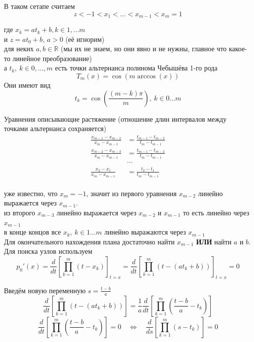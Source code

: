 \documentclass[12pt,a4paper]{article}
\begin{document}
	\noindent В таком сетапе считаем
	\[
	z < -1 < x_1 < \ldots < x_{m-1} < x_m = 1
	\]
	
	\noindent где $x_k = a t_{k} + b, k \in 1, \ldots m$ \\
	и $z=a t_0 + b$, $a > 0$ (её игнорим)\\
	для неких $a, b \in \mathbb{R}$ (мы их не знаем, но они явно и не нужны, главное что какое-то линейное преобразование) \\
	а $t_k, \  k \in 0, \ldots, m$ есть точки альтернанса полинома Чебышёва 1-го рода 
	\[
	T_{m}(x) = \cos( m \arccos(x))
	\]
	\noindent Они имеют вид 
	\[
	t_k = \cos \left( \frac{ (m-k) \pi}{m} \right), \ k \in 0 \ldots m
	\]
	
	\noindent Уравнения описывающие растяжение (отношение длин интервалов между точками альтернанса сохраняется)
	\begin{align*}
		\frac{x_{m-1} - x_{m-2}}{x_m - x_{m-1}} &= \frac{t_{m-1} - t_{m-2}}{t_m - t_{m-1}}\\[0.1in]
		\frac{x_{m-2} - x_{m-3}}{x_m - x_{m-1}} &= \frac{t_{m-1} - t_{m-2}}{t_m - t_{m-1}}\\[0.1in]
		&\cdots\\[0.1in]
		\frac{x_2 - x_1}{x_m - x_{m-1}} &= \frac{t_2 - t_1}{t_m - t_{m-1}}\\
	\end{align*}
	
	\noindent уже известно, что $x_m = -1$, значит из первого уравнения $x_{m-2}$ линейно выражается через $x_{m-1}$.\\
	из второго $x_{m-3}$ линейно выражается через $x_{m-2}$ и $x_{m-1}$ то есть линейно через $x_{m-1}$\\
	в конце концов все $x_k, \ k \in 1 \ldots m $ линейно выражаются через $x_{m-1}$\\
	Для окончательного нахождения плана достаточно найти $x_{m-1}$ \textbf{ИЛИ} найти $a$ и $b$.\\
	
	
	\noindent Для поиска узлов используем
	\[
	p_0'(x) = 
	\frac{d}{dt} \left[\prod_{k=1}^{m} (t - x_k) \right]_{t=x} = 
	\frac{d}{dt} \left[\prod_{k=1}^{m} (t - (at_{k} + b) ) \right]_{t=x} = 
	0
	\]
	
	\noindent Введём новую переменную $s = \frac{t-b}{a}$
	\[
	\frac{d}{dt} \left[\prod_{k=1}^{m} (t - (at_{k} + b) ) \right] =
	\frac{1}{a}\frac{d}{dt} \left[\prod_{k=1}^{m} \left( \frac{t-b}{a} - t_{k} \right) \right] 
	\]
	\[
	\frac{d}{dt} \left[\prod_{k=1}^{m} \left( \frac{t-b}{a} - t_{k} \right) \right] = 0 
	\quad \Longleftrightarrow \quad
	\frac{d}{ds} \left[\prod_{k=1}^{m} \left( s - t_{k} \right) \right] = 0
	\]
	
\end{document}
